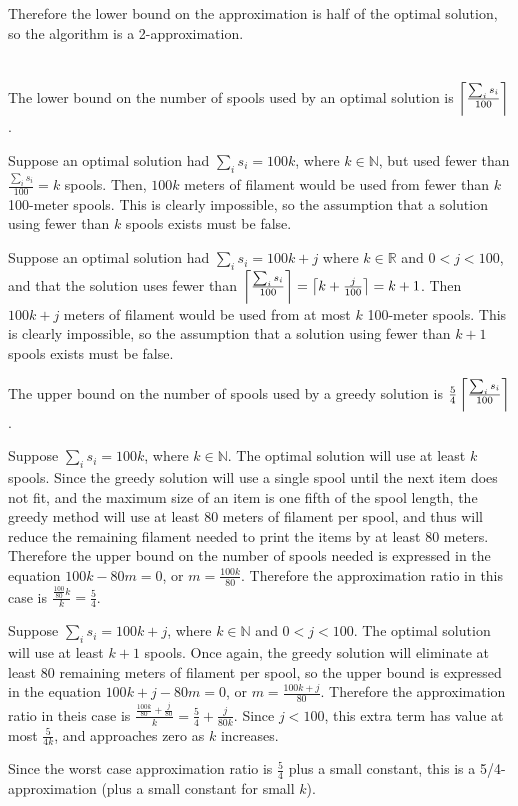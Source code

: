 \documentclass[11pt]{article}
\newcommand{\ceil}[1]{\ensuremath \left\lceil #1 \right\rceil}
\begin{document}
Therefore the lower bound on the approximation is half of the optimal solution, so the algorithm is a 2-approximation.

\section{}


The lower bound on the number of spools used by an optimal solution is $\ceil{\frac{\sum_i s_i}{100}}$. 

Suppose an optimal solution had $\sum_i s_i = 100k$, where $k \in \mathbb{N}$, but used fewer than $\frac{\sum_i s_i}{100} = k$ spools. Then, $100k$ meters of filament would be used from fewer than $k$ 100-meter spools. This is clearly impossible, so the assumption that a solution using fewer than $k$ spools exists must be false.

Suppose an optimal solution had $\sum_i s_i = 100k + j$ where $k \in \mathbb{R}$ and $0 < j < 100$, and that the solution uses fewer than $\ceil{\frac{\sum_i s_i}{100}} = \ceil{k + \frac{j}{100}} = k+1$. Then $100k + j$ meters of filament would be used from at most $k$ 100-meter spools. This is clearly impossible, so the assumption that a solution using fewer than $k+1$ spools exists must be false.

The upper bound on the number of spools used by a greedy solution is $\frac{5}{4}\ceil{\frac{\sum_i s_i}{100}}$. 

Suppose $\sum_i s_i = 100k$, where $k \in \mathbb{N}$. The optimal solution will use at least $k$ spools. Since the greedy solution will use a single spool until the next item does not fit, and the maximum size of an item is one fifth of the spool length, the greedy method will use at least 80 meters of filament per spool, and thus will reduce the remaining filament needed to print the items by at least 80 meters. Therefore the upper bound on the number of spools needed is expressed in the equation $100k - 80m = 0$, or $m = \frac{100k}{80}$. Therefore the approximation ratio in this case is $\frac{\frac{100}{80}k}{k} = \frac{5}{4}$. 

Suppose $\sum_i s_i = 100k +j$, where $k \in \mathbb{N}$ and $0 < j < 100$. The optimal solution will use at least $k+1$ spools. Once again, the greedy solution will eliminate at least 80 remaining meters of filament per spool, so the upper bound is expressed in the equation $100k + j - 80m = 0$, or $m = \frac{100k + j}{80}$. Therefore the approximation ratio in theis case is $\frac{\frac{100k}{80} + \frac{j}{80}}{k} = \frac{5}{4} + \frac{j}{80k}$. Since $j < 100$, this extra term has value at most $\frac{5}{4k}$, and approaches zero as $k$ increases.

Since the worst case approximation ratio is $\frac{5}{4}$ plus a small constant, this is a 5/4-approximation (plus a small constant for small $k$).
\end{document}
